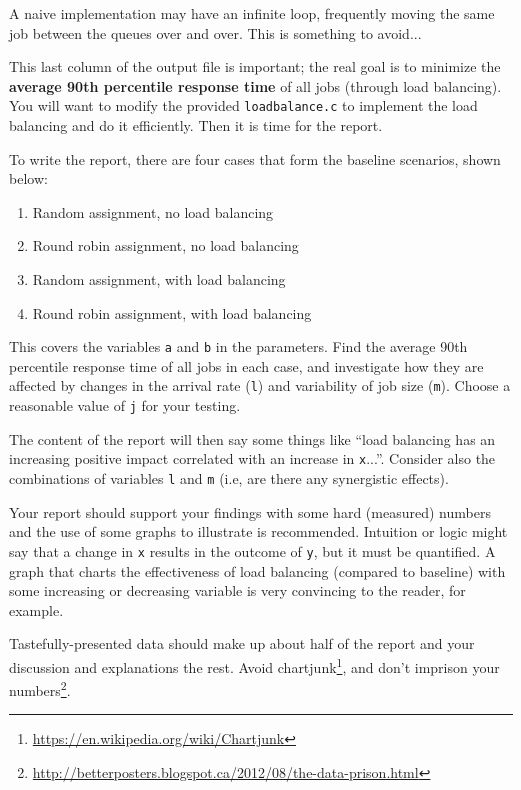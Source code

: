 \documentclass[letterpaper,10pt]{article}
\begin{document}
A naive implementation may have an infinite loop, frequently moving the same job between the queues over and over. This is something to avoid...

This last column of the output file is important; the real goal is to minimize the \textbf{average 90th percentile response time} of all jobs (through load balancing). You will want to modify the provided \texttt{loadbalance.c} to implement the load balancing and do it efficiently. Then it is time for the report.

To write the report, there are four cases that form the baseline scenarios, shown below: 

\begin{enumerate}
	\item Random assignment, no load balancing
	\item Round robin assignment, no load balancing
	\item Random assignment, with load balancing
	\item Round robin assignment, with load balancing
\end{enumerate}

This covers the variables \texttt{a} and \texttt{b} in the parameters. Find the average 90th percentile response time of all jobs in each case, and investigate how they are affected by changes in the arrival rate (\texttt{l}) and variability of job size (\texttt{m}). Choose a reasonable value of \texttt{j} for your testing.

The content of the report will then say some things like ``load balancing has an increasing positive impact correlated with an increase in \texttt{x}...''. Consider also the combinations of variables \texttt{l} and \texttt{m} (i.e, are there any synergistic effects).

Your report should support your findings with some hard (measured) numbers and the use of some graphs to illustrate is recommended. Intuition or logic might say that a change in \texttt{x} results in the outcome of \texttt{y}, but it must be quantified. A graph that charts the effectiveness of load balancing (compared to baseline) with some increasing or decreasing variable is very convincing to the reader, for example.

Tastefully-presented data should make up about half of the report and your discussion and explanations the rest. Avoid chartjunk\footnote{\url{https://en.wikipedia.org/wiki/Chartjunk}}, and don't imprison your numbers\footnote{\url{http://betterposters.blogspot.ca/2012/08/the-data-prison.html}}.
\end{document}
